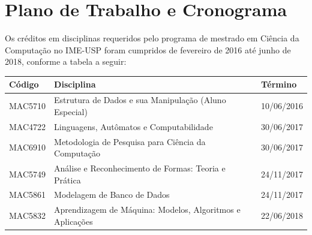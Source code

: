 \chapter{Plano de Trabalho e Cronograma}
\label{cap:Cronogramanotes}


Os créditos em disciplinas requeridos pelo programa de mestrado em Ciência da Computação
no IME-USP foram cumpridos de fevereiro de 2016 até junho de 2018, conforme a tabela a seguir: 

\begin{center}
\begin{tabular}{ |l|l|l| } 
\hline
\textbf{Código} & \textbf{Disciplina}                                   & \textbf{Término} \\ 
\hline
MAC5710     & Estrutura de Dados e sua Manipulação (Aluno Especial)     & 10/06/2016       \\
MAC4722     & Linguagens, Autômatos e Computabilidade                   & 30/06/2017       \\
MAC6910     & Metodologia de Pesquisa para Ciência da Computação        & 30/06/2017       \\
MAC5749     & Análise e Reconhecimento de Formas: Teoria e Prática      & 24/11/2017       \\
MAC5861     & Modelagem de Banco de Dados                               & 24/11/2017       \\
MAC5832     & Aprendizagem de Máquina: Modelos, Algoritmos e Aplicações & 22/06/2018       \\
\hline
\end{tabular}
\end{center}



